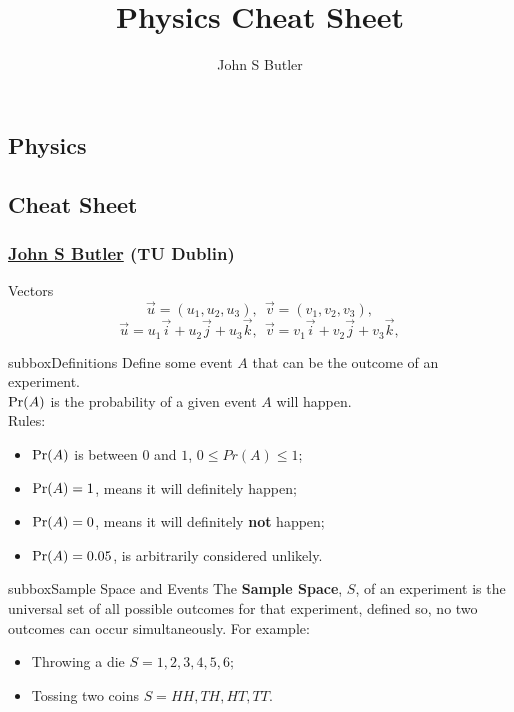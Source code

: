 \documentclass[10pt,a4paper]{article}
\title{Physics Cheat Sheet}
\author{John S Butler }
\def\Pr{\mathop{\rm Pr}}
\begin{document}
\small
\begin{multicols}{3}

\scriptsize


\section*{Physics}
\subsection*{Cheat Sheet}

\subsubsection*{\href{johnsbutler.netlify.com}{John S Butler} (TU Dublin) }

\begin{textbox}{Vectors }
		\[\vec{u}=(u_1,u_2,u_3), \ \ \vec{v}=(v_1,v_2,v_3), \]
		\[\vec{u}=u_1\vec{i}+u_2\vec{j}+u_3\vec{k}, \ \ \vec{v}=v_1\vec{i}+v_2\vec{j}+v_3\vec{k}, \]

\begin{subbox}{subbox}{Definitions}
\tiny
Define some event $A$ that can be the outcome of an experiment.\\
$\Pr(A)$ is the probability of a given event $A$ will happen.\\
Rules:
\begin{itemize}
    \item $\Pr(A)$ is between $0$ and $1$, $0\leq Pr(A) \leq 1$;
    \item $\Pr(A)=1$, means it will definitely happen;
    \item $\Pr(A)=0$, means it will definitely \textbf{not} happen;
    \item $\Pr(A)=0.05$, is arbitrarily considered unlikely.
\end{itemize}
\end{subbox}

\begin{subbox}{subbox}{Sample Space and Events}
\tiny
The \textbf{Sample Space}, $S$, of an experiment is the universal set of all possible outcomes for that experiment, defined so, no two outcomes can occur simultaneously. For example:
\begin{itemize}
    \item Throwing a die $S={1,2,3,4,5,6};$
    \item Tossing two coins $S={HH,TH,HT,TT}.$
\end{itemize}


\end{subbox}
\end{textbox}
\end{multicols}
\end{document}
